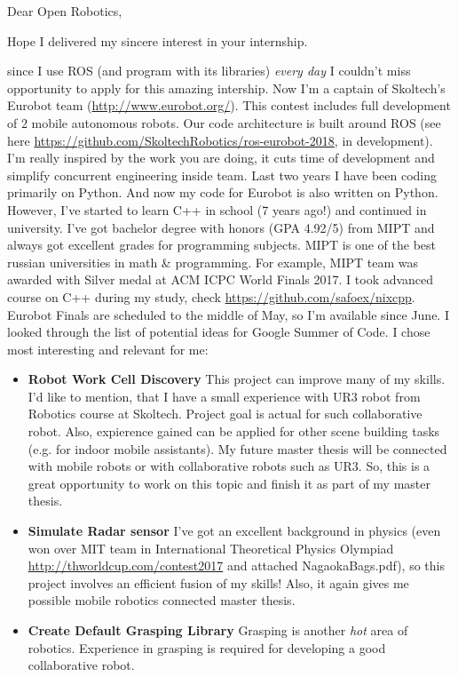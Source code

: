 \documentclass[11pt,a4paper,roman]{moderncv}        %
\begin{document}
\date{\today}
\opening{Dear Open Robotics,}
\closing{Hope I delivered my sincere interest in your internship.}
\makelettertitle
since I use ROS (and program with its libraries) \textit{every day} I couldn't miss opportunity to apply for this amazing intership. Now I'm a captain of Skoltech's Eurobot team (\url{http://www.eurobot.org/}). This contest includes full development of 2 mobile autonomous robots. Our code architecture is built around ROS (see here \url{https://github.com/SkoltechRobotics/ros-eurobot-2018}, in development). I'm really inspired by the work you are doing, it cuts time of development and simplify concurrent engineering inside team.
\newline
\newline
Last two years I have been coding primarily on Python. And now my code for Eurobot is also written on Python. However, I've started to learn C++ in school (7 years ago!) and continued in university. I've got bachelor degree with honors (GPA 4.92/5) from MIPT and always got excellent grades for programming subjects. MIPT is one of the best russian universities in math \& programming. For example, MIPT team was awarded with Silver medal at ACM ICPC World Finals 2017. I took advanced course on C++ during my study, check \url{https://github.com/safoex/nixcpp}.
\newline
\newline
Eurobot Finals are scheduled to the middle of May, so I'm available since June. I looked through the list of potential ideas for Google Summer of Code. I chose most interesting and relevant for me:
\begin{itemize}
	\item \textbf{Robot Work Cell Discovery} This project can improve many of my skills. I'd like to mention, that I have a small experience with UR3 robot from Robotics course at Skoltech. Project goal is actual for such collaborative robot. Also, expierence gained can be applied for other scene building tasks (e.g. for indoor mobile assistants). My future master thesis will be connected with mobile robots or with collaborative robots such as UR3. So, this is a great opportunity to work on this topic and finish it as part of my master thesis. 
	\item \textbf{Simulate Radar sensor} I've got an excellent background in physics (even won over MIT team in International Theoretical Physics Olympiad \url{http://thworldcup.com/contest2017} and attached NagaokaBags.pdf), so this project involves an efficient fusion of my skills! Also, it again gives me possible mobile robotics connected master thesis.
	\item \textbf{Create Default Grasping Library} Grasping is another \textit{hot} area of robotics. Experience in grasping is required for developing a good collaborative robot.  	
\end{itemize}
\end{document}
